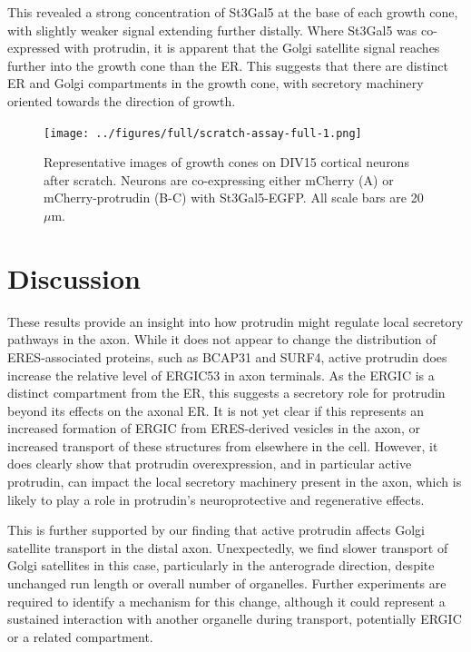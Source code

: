 \documentclass[
  12pt,
  a4paper,
]{book}
\begin{document}
This revealed a strong concentration of St3Gal5 at the base of each growth cone, with slightly weaker signal extending further distally. Where St3Gal5 was co-expressed with protrudin, it is apparent that the Golgi satellite signal reaches further into the growth cone than the ER. This suggests that there are distinct ER and Golgi compartments in the growth cone, with secretory machinery oriented towards the direction of growth.

\begin{figure}
\centering
\texttt{[image: ../figures/full/scratch-assay-full-1.png]}
\caption{\label{fig:scratch-assay-full}Representative images of growth cones on DIV15 cortical neurons after scratch. Neurons are co-expressing either mCherry (A) or mCherry-protrudin (B-C) with St3Gal5-EGFP. All scale bars are 20\(\mu\)m.}
\end{figure}

\hypertarget{discussion-1}{%
\section{Discussion}\label{discussion-1}}

These results provide an insight into how protrudin might regulate local secretory pathways in the axon. While it does not appear to change the distribution of ERES-associated proteins, such as BCAP31 and SURF4, active protrudin does increase the relative level of ERGIC53 in axon terminals. As the ERGIC is a distinct compartment from the ER, this suggests a secretory role for protrudin beyond its effects on the axonal ER. It is not yet clear if this represents an increased formation of ERGIC from ERES-derived vesicles in the axon, or increased transport of these structures from elsewhere in the cell. However, it does clearly show that protrudin overexpression, and in particular active protrudin, can impact the local secretory machinery present in the axon, which is likely to play a role in protrudin's neuroprotective and regenerative effects.

This is further supported by our finding that active protrudin affects Golgi satellite transport in the distal axon. Unexpectedly, we find slower transport of Golgi satellites in this case, particularly in the anterograde direction, despite unchanged run length or overall number of organelles. Further experiments are required to identify a mechanism for this change, although it could represent a sustained interaction with another organelle during transport, potentially ERGIC or a related compartment.
\end{document}
